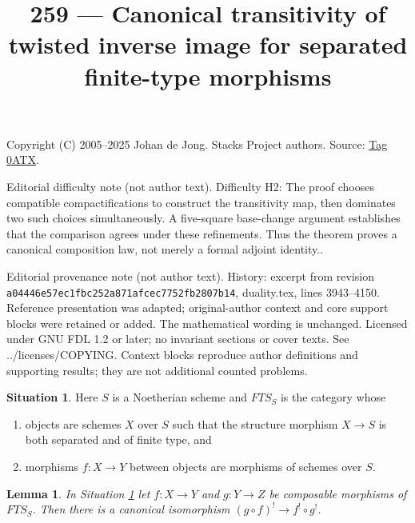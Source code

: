 \documentclass{amsart}
\theoremstyle{plain}
\newtheorem{lemma}[subsection]{Lemma}
\theoremstyle{definition}
\newtheorem{situation}[subsection]{Situation}
\theoremstyle{remark}
\numberwithin{equation}{subsection}
\begin{document}
\title[Stacks Project, Tag 0ATX]{259 --- Canonical transitivity of twisted inverse image for separated finite-type morphisms}
\maketitle
\noindent Copyright (C) 2005--2025 Johan de Jong. Stacks Project authors. Source: \href{https://stacks.math.columbia.edu/tag/0ATX}{Tag 0ATX}.

\noindent Editorial difficulty note (not author text). Difficulty H2: The proof chooses compatible compactifications to construct the transitivity map, then dominates two such choices simultaneously. A five-square base-change argument establishes that the comparison agrees under these refinements. Thus the theorem proves a canonical composition law, not merely a formal adjoint identity..

\noindent Editorial provenance note (not author text). History: excerpt from revision \texttt{a0444\allowbreak 6e57e\allowbreak c1fbc\allowbreak 252a8\allowbreak 71afc\allowbreak ec775\allowbreak 2fb28\allowbreak 07b14}, duality.tex, lines 3943--4150. Reference presentation was adapted; original-author context and core support blocks were retained or added. The mathematical wording is unchanged. Licensed under GNU FDL 1.2 or later; no invariant sections or cover texts. See ../licenses/COPYING. Context blocks reproduce author definitions and supporting results; they are not additional counted problems.

\begin{situation}
\label{situation-shriek}
Here $S$ is a Noetherian scheme and $\textit{FTS}_S$ is the category whose
\begin{enumerate}
\item objects are schemes $X$ over $S$ such that the structure
morphism $X \to S$ is both separated and of finite type, and
\item morphisms $f : X \to Y$ between objects are morphisms
of schemes over $S$.
\end{enumerate}
\end{situation}

\begin{lemma}
\label{lemma-upper-shriek-composition}
In Situation \ref{situation-shriek} let $f : X \to Y$ and $g : Y \to Z$
be composable morphisms of $\textit{FTS}_S$. Then there is a canonical
isomorphism $(g \circ f)^! \to f^! \circ g^!$.
\end{lemma}
\end{document}

